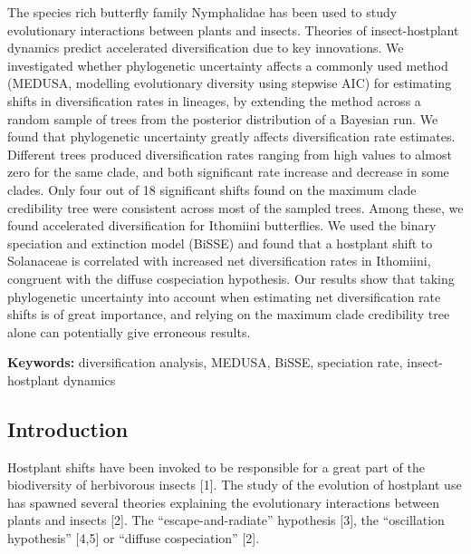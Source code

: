 \documentclass[]{article}
\begin{document}
The species rich butterfly family Nymphalidae has been used to study
evolutionary interactions between plants and insects. Theories of
insect-hostplant dynamics predict accelerated diversification due to key
innovations. We investigated whether phylogenetic uncertainty affects a
commonly used method (MEDUSA, modelling evolutionary diversity using
stepwise AIC) for estimating shifts in diversification rates in
lineages, by extending the method across a random sample of trees from
the posterior distribution of a Bayesian run. We found that phylogenetic
uncertainty greatly affects diversification rate estimates. Different
trees produced diversification rates ranging from high values to almost
zero for the same clade, and both significant rate increase and decrease
in some clades. Only four out of 18 significant shifts found on the
maximum clade credibility tree were consistent across most of the
sampled trees. Among these, we found accelerated diversification for
Ithomiini butterflies. We used the binary speciation and extinction
model (BiSSE) and found that a hostplant shift to Solanaceae is
correlated with increased net diversification rates in Ithomiini,
congruent with the diffuse cospeciation hypothesis. Our results show
that taking phylogenetic uncertainty into account when estimating net
diversification rate shifts is of great importance, and relying on the
maximum clade credibility tree alone can potentially give erroneous
results.

\textbf{Keywords:} diversification analysis, MEDUSA, BiSSE, speciation
rate, insect-hostplant dynamics

\subsection{Introduction}\label{introduction}

Hostplant shifts have been invoked to be responsible for a great part of
the biodiversity of herbivorous insects {[}1{]}. The study of the
evolution of hostplant use has spawned several theories explaining the
evolutionary interactions between plants and insects {[}2{]}. The
``escape-and-radiate'' hypothesis {[}3{]}, the ``oscillation
hypothesis'' {[}4,5{]} or ``diffuse cospeciation'' {[}2{]}.
\end{document}
